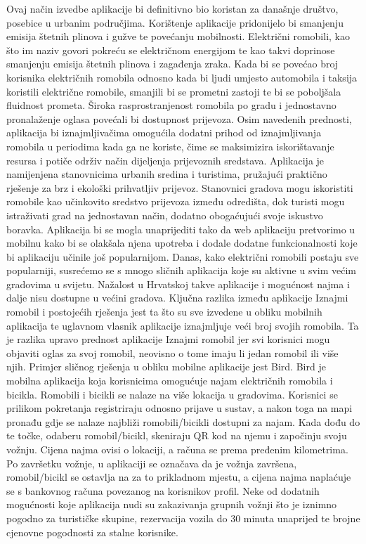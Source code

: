 		Ovaj način izvedbe aplikacije bi definitivno bio koristan za današnje društvo, posebice u urbanim područjima. Korištenje aplikacije pridonijelo bi smanjenju emisija štetnih plinova i gužve te povećanju mobilnosti. Električni romobili, kao što im naziv govori pokreću se električnom energijom te kao takvi doprinose smanjenju emisija štetnih plinova i zagađenja zraka. Kada bi se povećao broj korisnika električnih romobila odnosno kada bi ljudi umjesto automobila i taksija koristili električne romobile, smanjili bi se prometni zastoji te bi se poboljšala fluidnost prometa. Široka rasprostranjenost romobila po gradu i jednostavno pronalaženje oglasa povećali bi dostupnost prijevoza. Osim navedenih prednosti, aplikacija bi  iznajmljivačima omogućila dodatni prihod od iznajmljivanja romobila u periodima kada ga ne koriste, čime se maksimizira iskorištavanje resursa i potiče održiv način dijeljenja prijevoznih sredstava. Aplikacija je namijenjena stanovnicima urbanih sredina i turistima, pružajući praktično rješenje za brz i ekološki prihvatljiv prijevoz. Stanovnici gradova mogu iskoristiti romobile kao učinkovito sredstvo prijevoza između odredišta, dok turisti mogu istraživati grad na jednostavan način, dodatno obogaćujući svoje iskustvo boravka. Aplikacija bi se mogla unaprijediti tako da web aplikaciju pretvorimo u mobilnu kako bi se olakšala njena upotreba i  dodale dodatne funkcionalnosti koje bi aplikaciju učinile još popularnijom.  
		\newline
		\newline
		Danas, kako električni romobili postaju sve popularniji, susrećemo se s mnogo sličnih aplikacija koje su aktivne u svim većim gradovima u svijetu. Nažalost u Hrvatskoj takve aplikacije i mogućnost najma i dalje nisu dostupne u većini gradova. Ključna razlika između aplikacije Iznajmi romobil i postojećih rješenja jest ta što su sve izvedene u obliku mobilnih aplikacija te uglavnom vlasnik aplikacije iznajmljuje veći broj svojih romobila. Ta je razlika upravo prednost aplikacije Iznajmi romobil jer svi korisnici mogu objaviti oglas za svoj romobil, neovisno o tome imaju li jedan romobil ili više njih. Primjer sličnog rješenja u obliku mobilne aplikacije jest Bird. Bird je mobilna aplikacija koja korisnicima omogućuje najam električnih romobila i bicikla. Romobili i bicikli se nalaze na više lokacija u gradovima. Korisnici se prilikom pokretanja registriraju odnosno prijave u sustav, a nakon toga na mapi pronađu gdje se nalaze najbliži romobili/bicikli dostupni za najam. Kada dođu do te točke, odaberu romobil/bicikl, skeniraju QR kod na njemu i započinju svoju vožnju. Cijena najma ovisi o lokaciji, a  računa se prema pređenim kilometrima. Po završetku vožnje, u aplikaciji se označava da je vožnja završena, romobil/bicikl se ostavlja na za to prikladnom mjestu, a cijena najma naplaćuje se s bankovnog računa povezanog na korisnikov profil. Neke od dodatnih mogućnosti koje aplikacija nudi su zakazivanja grupnih vožnji što je iznimno pogodno za turističke skupine, rezervacija vozila do 30 minuta unaprijed te brojne cjenovne pogodnosti za stalne korisnike.
		
